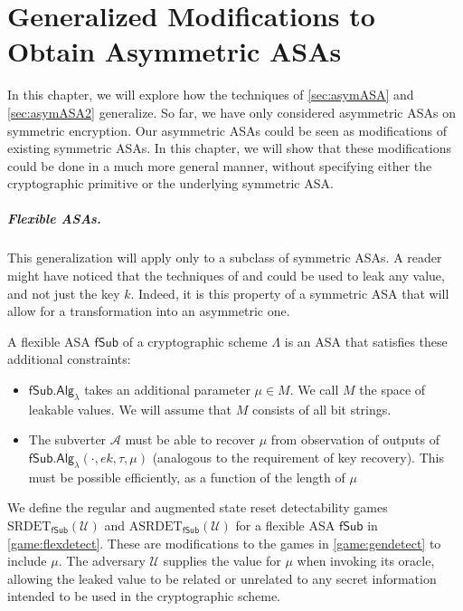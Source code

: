 \chapter{Generalized Modifications to Obtain Asymmetric ASAs} \label{sec:generalize}
In this chapter, we will explore how the techniques of \autoref{sec:asymASA} and \autoref{sec:asymASA2} generalize. So far, we have only considered asymmetric ASAs on symmetric encryption. Our asymmetric ASAs could be seen as modifications of existing symmetric ASAs. In this chapter, we will show that these modifications could be done in a much more general manner, without specifying either the cryptographic primitive or the underlying symmetric ASA.

\paragraph{Flexible ASAs.} This generalization will apply only to a subclass of symmetric ASAs. A reader might have noticed that the techniques of \cite{C:BelPatRog14} and \cite{CCS:BelJaeKan15} could be used to leak any value, and not just the key $k$. Indeed, it is this property of a symmetric ASA that will allow for a transformation into an asymmetric one.

A flexible ASA $\mathsf{fSub}$ of a cryptographic scheme $\mathsf{\Lambda}$ is an ASA that satisfies these additional constraints:
\begin{itemize}\itemsep0em
\item $\mathsf{fSub.Alg}_\lambda$ takes an additional parameter $\mu\in M$. We call $M$ the space of leakable values. We will assume that $M$ consists of all bit strings.
\item The subverter $\mathcal{A}$ must be able to recover $\mu$ from observation of outputs of $\mathsf{fSub.Alg}_\lambda(\cdot,\allowbreak{}ek,\tau,\mu)$ (analogous to the requirement of key recovery). This must be possible efficiently, as a function of the length of $\mu$
\end{itemize}

We define the regular and augmented state reset detectability games $\mathrm{SRDET}_\mathsf{fSub}(\mathcal{U})$ and $\mathrm{ASRDET}_\mathsf{fSub}(\mathcal{U})$ for a flexible ASA $\mathsf{fSub}$ in \autoref{game:flexdetect}. These are modifications to the games in \autoref{game:gendetect} to include $\mu$. The adversary $\mathcal{U}$ supplies the value for $\mu$ when invoking its oracle, allowing the leaked value to be related or unrelated to any secret information intended to be used in the cryptographic scheme.


